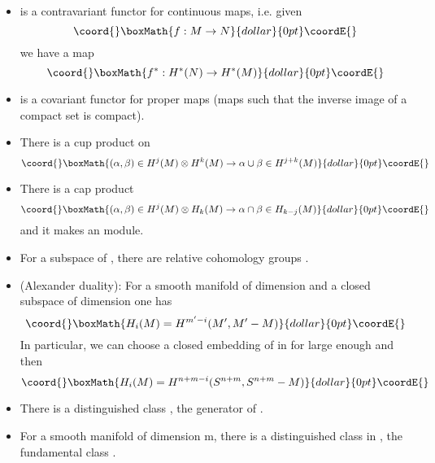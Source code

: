 \documentclass[a4paper,a4paper]{article}
\theoremstyle{conjecture}
\begin{document}
\begin{itemize}
\item {}\coordHE{} is a contravariant functor for
continuous maps, i.e. given $$\coord{}\boxMath{f:M\rightarrow N}{dollar}{0pt}\coordE{}$$
we have a map
$$\coord{}\boxMath{f^*:H^*(N) \rightarrow H^*(M)}{dollar}{0pt}\coordE{}$$
\item {}\coordHE{} is a covariant functor for proper maps (maps such that the inverse
image of a compact set is compact).

\item There is a cup product on \coordHE{}  $$\coord{}\boxMath{(\alpha, \beta)\in H^j(M)\otimes H^k(M)\rightarrow \alpha\cup\beta\in H^{j+k}(M)}{dollar}{0pt}\coordE{}$$

\item There is a cap product
$$\coord{}\boxMath{(\alpha, \beta)\in H^j(M)\otimes H_k(M)\rightarrow \alpha\cap\beta\in H_{k-j}(M)}{dollar}{0pt}\coordE{}$$
and it makes \coordHE{} an \coordHE{} module.

\item For \coordHE{} a subspace of \coordHE{}, there are
relative cohomology groups \coordHE{}. 

\item (Alexander duality): For \coordHE{} a smooth manifold of dimension \coordHE{} and
\coordHE{} a closed subspace of dimension \coordHE{} one has
$$\coord{}\boxMath{H_i(M)=H^{m^\prime -i}(M^\prime, M^\prime -M)}{dollar}{0pt}\coordE{}$$
In particular,
we can choose a closed embedding of \coordHE{} in \coordHE{} for \coordHE{} large enough and
then
$$\coord{}\boxMath{H_i(M)=H^{n+m-i}(S^{n+m},S^{n+m}-M)}{dollar}{0pt}\coordE{}$$

\item There is a distinguished class \coordHE{}, the generator of 
\coordHE{}.

\item For \coordHE{} a smooth manifold of dimension m, there is a distinguished class in \coordHE{}, the fundamental class \myHighlight{$[M]$}\coordHE{}.


\end{itemize}
\end{document}
